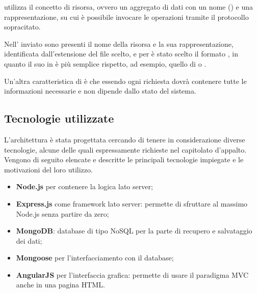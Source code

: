  utilizza il concetto di risorsa, ovvero un aggregato di dati con un nome () e una rappresentazione, su cui è possibile invocare le operazioni  tramite il protocollo sopracitato.

Nell' inviato sono presenti il nome della risorsa e la sua rappresentazione, identificata dall'estensione del file scelto, e per \ProjectName è stato scelto il formato , in quanto il suo  in  è più semplice rispetto, ad esempio, quello di  o .

Un'altra caratteristica di  è che essendo  ogni richiesta dovrà contenere tutte le informazioni necessarie e non dipende dallo stato del sistema.

\subsection{Tecnologie utilizzate}
L'architettura è stata progettata cercando di tenere in considerazione diverse tecnologie, alcune delle quali espressamente richieste nel capitolato d'appalto. Vengono di seguito elencate e descritte le principali tecnologie impiegate e le motivazioni del loro utilizzo.

\begin{itemize}
	\item \textbf{Node.js} per contenere la logica lato server;
	\item \textbf{Express.js} come framework lato server: permette di sfruttare al massimo Node.js senza partire da zero;
	\item \textbf{MongoDB}: database di tipo NoSQL per la parte di recupero e salvataggio dei dati;
	\item \textbf{Mongoose} per l’interfacciamento con il database;
	\item \textbf{AngularJS} per l'interfaccia grafica: permette di usare il paradigma MVC anche in una pagina HTML.
\end{itemize}



